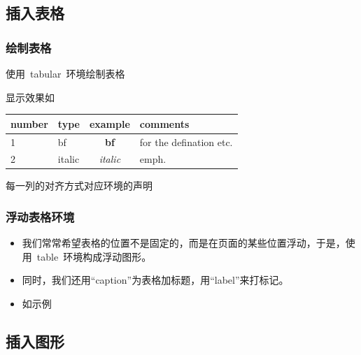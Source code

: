 \subsection{插入表格}

\begin{frame}
	\frametitle{绘制表格}
	\begin{overprint}
		\begin{block}{使用~tabular~环境绘制表格}
				
		\end{block}
		\begin{block}{显示效果如}
			\begin{tabular}{|l|lc|p{5em}|}
			\hline
			number & type & example & comments \\
			\hline
			\hline
			1	& bf	&\textbf{bf}	& for the
		    defination etc.\\
			2	& italic&\textit{italic}& emph.\\
			\hline
			\end{tabular}

			每一列的对齐方式对应环境的声明
				
			
		\end{block}
	\end{overprint}
\end{frame}

\begin{frame}
	\frametitle{浮动表格环境}
	\begin{itemize}
		\item<1-> 我们常常希望表格的位置不是固定的，而是在页面的某些位置浮动，于是，使用~\alert{table}~环境构成浮动图形。
		\item<2-> 同时，我们还用``\alert{caption}''为表格加标题，用``\alert{label}''来打标记。
		\item<3-> 如示例
				
	\end{itemize}
\end{frame}

%

\subsection{插入图形}

